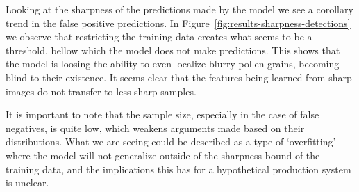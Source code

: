 Looking at the sharpness of the predictions made by the model we see a corollary trend in the false positive predictions.
In Figure~\ref{fig:results-sharpness-detections} we observe that restricting the training data creates what seems to be a threshold, bellow which the model does not make predictions.
This shows that the model is loosing the ability to even localize blurry pollen grains, becoming blind to their existence.
It seems clear that the features being learned from sharp images do not transfer to less sharp samples.

It is important to note that the sample size, especially in the case of false negatives, is quite low, which weakens arguments made based on their distributions.
What we are seeing could be described as a type of `overfitting' where the model will not generalize outside of the sharpness bound of the training data, and the implications this has for a hypothetical production system is unclear.


